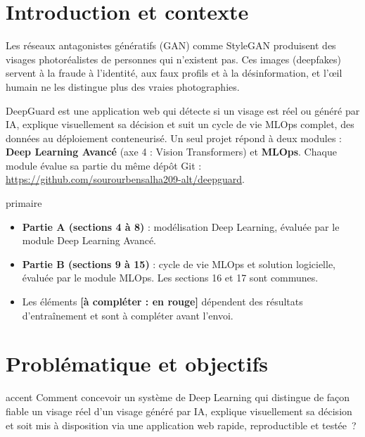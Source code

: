 \documentclass[11pt,a4paper]{article}
\newcommand{\nomprojet}{DeepGuard}
\newcommand{\aremplir}[1]{\textcolor{accent}{\textbf{[à compléter : #1]}}}
\begin{document}
\tableofcontents
\newpage

\section{Introduction et contexte}

Les réseaux antagonistes génératifs (GAN) comme StyleGAN produisent des visages photoréalistes de personnes qui
n'existent pas. Ces images (deepfakes) servent à la fraude à l'identité, aux faux profils et à la désinformation, et
l'œil humain ne les distingue plus des vraies photographies.

\nomprojet{} est une application web qui détecte si un visage est réel ou généré par IA, explique visuellement sa
décision et suit un cycle de vie MLOps complet, des données au déploiement conteneurisé. Un seul projet répond à deux
modules : \textbf{Deep Learning Avancé} (axe 4 : Vision Transformers) et \textbf{MLOps}. Chaque module évalue sa
partie du même dépôt Git :
\url{https://github.com/sourourbensalha209-alt/deepguard}.

\begin{encadre}[title=Comment lire ce rapport]{primaire}
\begin{itemize}
  \item \textbf{Partie A (sections 4 à 8)} : modélisation Deep Learning, évaluée par le module Deep Learning Avancé.
  \item \textbf{Partie B (sections 9 à 15)} : cycle de vie MLOps et solution logicielle, évaluée par le module MLOps. Les sections 16 et 17 sont communes.
  \item Les éléments \aremplir{en rouge} dépendent des résultats d'entraînement et sont à compléter avant l'envoi.
\end{itemize}
\end{encadre}

\section{Problématique et objectifs}

\begin{encadre}[title=Problématique]{accent}
Comment concevoir un système de Deep Learning qui distingue de façon fiable un visage réel d'un visage généré par IA,
explique visuellement sa décision et soit mis à disposition via une application web rapide, reproductible et testée~?
\end{encadre}
\end{document}
